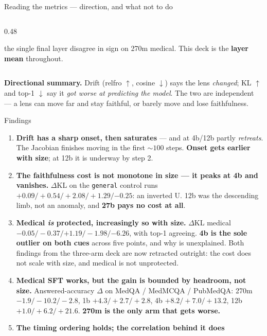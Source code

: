 \documentclass[aspectratio=169,10pt]{beamer}
\newcommand{\good}[1]{\textcolor{up}{#1}}
\newcommand{\bad}[1]{\textcolor{down}{#1}}
\begin{document}
\begin{frame}{Reading the metrics --- direction, and what not to do}
\begin{columns}[T]
\begin{column}{0.48\textwidth}
{\begin{enumerate}
          the single final layer disagree in sign on 270m medical. This deck is
          the \textbf{layer mean} throughout.
      \end{enumerate}}
    \end{column}
  \end{columns}
  \vspace{0.3em}
  {\footnotesize \textbf{Directional summary.} Drift (relfro $\uparrow$, cosine
  $\downarrow$) says the lens \emph{changed}; KL $\uparrow$ and top-1 $\downarrow$
  say it \emph{got worse at predicting the model}. The two are independent ---
  a lens can move far and stay faithful, or barely move and lose faithfulness.}
\end{frame}

\begin{frame}{Findings}
  \begin{enumerate}\setlength{\itemsep}{0.35em}
    \item \textbf{Drift has a sharp onset, then saturates} --- and at 4b/12b
      partly \emph{retreats}. The Jacobian finishes moving in the first
      ${\sim}100$ steps. \textbf{Onset gets earlier with size}; at 12b it is
      underway by step 2.
    \item[2.] \bad{\textbf{The faithfulness cost is not monotone in size --- it
      peaks at 4b and vanishes.}} $\Delta$KL on the \texttt{general} control runs
      $+0.09 / +0.54 / +2.08 / +1.29 / \mathbf{-0.25}$: an inverted U. 12b was
      the descending limb, not an anomaly, and \textbf{27b pays no cost at all}.
    \item[3.] \good{\textbf{Medical \emph{is} protected, increasingly so with
      size.}} $\Delta$KL medical $-0.05 / -0.37 / \mathbf{+1.19} / -1.98 /
      \mathbf{-6.26}$, with top-1 agreeing. \textbf{4b is the sole outlier on
      both cues} across five points, and why is unexplained.
      \good{Both findings from the three-arm deck are now retracted outright:
      the cost does not scale with size, and medical is not unprotected.}
    \item[4.] \textbf{Medical SFT works, but the gain is bounded by headroom,
      not size.} Answered-accuracy $\Delta$ on MedQA / MedMCQA / PubMedQA:
      270m \bad{$-1.9/-10.2/-2.8$}, 1b \good{$+4.3/+2.7/+2.8$},
      4b \good{$+8.2/+7.0/+13.2$}, 12b \good{$+1.0/+6.2/+21.6$}.
      \textbf{270m is the only arm that gets worse.}
    \item[5.] \textbf{The timing ordering holds; the correlation behind it does
}
\end{enumerate}
\end{frame}
\end{document}
